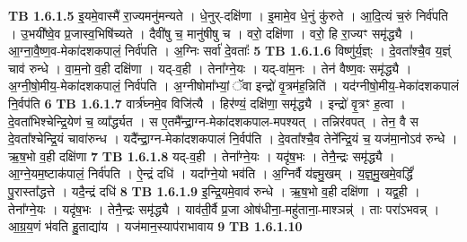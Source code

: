 \documentclass[17pt]{extarticle}
\begin{document}
                                \textbf{ TB 1.6.1.5} \newline
                  इ॒यमे॒वास्मै॑ रा॒ज्यमनु॑मन्यते । धे॒नुर्-दक्षि॑णा । इ॒मामे॒व धे॒नुं कु॑रुते । आ॒दि॒त्यं च॒रुं निर्व॑पति । उ॒भयी᳚ष्वे॒व प्र॒जास्व॒भिषि॑च्यते । दैवी॑षु च॒ मानु॑षीषु च । वरो॒ दक्षि॑णा । वरो॒ हि रा॒ज्यꣳ समृ॑द्ध्यै । आ॒ग्ना॒वै॒ष्ण॒व-मेका॑दशकपालं॒ निर्व॑पति । अ॒ग्निः सर्वा॑ दे॒वताः᳚ \textbf{ 5} \newline
                  \newline
                                \textbf{ TB 1.6.1.6} \newline
                  विष्णु॑र्य॒ज्ञ्ः । दे॒वता᳚श्चै॒व य॒ज्ञ्ं चाव॑ रुन्धे । वा॒म॒नो व॒ही दक्षि॑णा । यद्-व॒ही । तेना᳚ग्ने॒यः । यद्-वा॑म॒नः । तेन॑ वैष्ण॒वः समृ॑द्ध्यै । अ॒ग्नी॒षो॒मीय॒-मेका॑दशकपालं॒ निर्व॑पति । अ॒ग्नीषोमा᳚भ्यां॒ ॅवा इन्द्रो॑ वृ॒त्रम॑ह॒न्निति॑ । यद॑ग्नीषो॒मीय॒-मेका॑दशकपालं नि॒र्वप॑ति \textbf{ 6} \newline
                  \newline
                                \textbf{ TB 1.6.1.7} \newline
                  वार्त्र॑घ्नमे॒व विजि॑त्यै । हिर॑ण्यं॒ दक्षि॑णा॒ समृ॑द्ध्यै । इन्द्रो॑ वृ॒त्रꣳ ह॒त्वा । दे॒वता॑भिश्चेन्द्रि॒येण॑ च॒ व्या᳚र्द्ध्यत । स ए॒तमै᳚न्द्रा॒ग्न-मेका॑दशकपाल-मपश्यत् । तन्निर॑वपत् । तेन॒ वै स दे॒वता᳚श्चेन्द्रि॒यं चावा॑रुन्ध । यदै᳚न्द्रा॒ग्न-मेका॑दशकपालं नि॒र्वप॑ति । दे॒वता᳚श्चै॒व तेने᳚न्द्रि॒यं च॒ यज॑मा॒नोऽव॑ रुन्धे । ऋ॒ष॒भो व॒ही दक्षि॑णा \textbf{ 7} \newline
                  \newline
                                \textbf{ TB 1.6.1.8} \newline
                  यद्-व॒ही । तेना᳚ग्ने॒यः । यदृ॑ष॒भः । तेनै॒न्द्रः समृ॑द्ध्यै । आ॒ग्ने॒यम॒ष्टाक॑पालं॒ निर्व॑पति । ऐ॒न्द्रं दधि॑ । यदा᳚ग्ने॒यो भव॑ति । अ॒ग्निर्वै य॑ज्ञ्मु॒खम् । य॒ज्ञ्॒मु॒खमे॒वर्द्धिं॑ पु॒रास्ता᳚द्धत्ते । यदै॒न्द्रं दधि॑ \textbf{ 8} \newline
                  \newline
                                \textbf{ TB 1.6.1.9} \newline
                  इ॒न्द्रि॒यमे॒वाव॑ रुन्धे । ऋ॒ष॒भो व॒ही दक्षि॑णा । यद्व॒ही । तेना᳚ग्ने॒यः । यदृ॑ष॒भः । तेनै॒न्द्रः समृ॑द्ध्यै । याव॑ती॒र्वै प्र॒जा ओष॑धीना॒-महु॑ताना॒-माश्ञन्न्॑ । ताः परा॑ऽभवन्न् । आ॒ग्र॒य॒णं भ॑वति हु॒ताद्या॑य । यज॑मान॒स्याप॑राभावाय \textbf{ 9} \newline
                  \newline
                                \textbf{ TB 1.6.1.10} \newline
\end{document}
